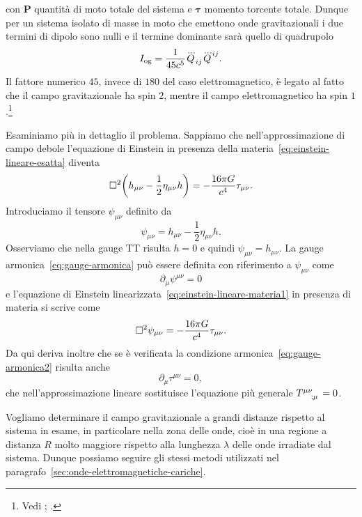 con $\bm{P}$ quantità di moto totale del sistema e $\bm{\tau}$ momento torcente
totale.  Dunque per un sistema isolato di masse in moto che emettono onde
gravitazionali i due termini di dipolo sono nulli e il termine dominante sarà
quello di quadrupolo
\begin{equation}
  I_{\textup{og}} = \frac{1}{45c^{5}}\dddot{Q}_{ij}\dddot{Q}^{ij}.
\end{equation}
Il fattore numerico $45$, invece di $180$ del caso elettromagnetico, è legato al
fatto che il campo gravitazionale ha spin $2$, mentre il campo elettromagnetico
ha spin $1$.\footnote{Vedi \textcite[974]{misner:gravitation};
  \textcite[471]{shapiro:black-holes}.}

Esaminiamo più in dettaglio il problema.  Sappiamo che nell'approssimazione di
campo debole l'equazione di Einstein in presenza della
materia~\eqref{eq:einstein-lineare-esatta} diventa
\begin{equation}
  \label{eq:einstein-lineare-materia1}
  \Box^{2} \bigg(h_{\mu\nu} - \frac{1}{2} \eta_{\mu\nu}h \bigg) = -\frac{16\pi
    G}{c^{4}} \tau_{\mu\nu}.
\end{equation}
Introduciamo il tensore $\psi_{\mu\nu}$ definito da
\begin{equation}
  \psi_{\mu\nu} = h_{\mu\nu} - \frac{1}{2} \eta_{\mu\nu} h.
\end{equation}
Osserviamo che nella gauge TT risulta $h = 0$ e quindi
$\psi_{\mu\nu} = h_{\mu\nu}$.  La gauge armonica~\eqref{eq:gauge-armonica} può
essere definita con riferimento a $\psi_{\mu\nu}$ come
\begin{equation}
  \label{eq:gauge-armonica2}
  \partial_{\mu}\psi^{\mu\nu} = 0
\end{equation}
e l'equazione di Einstein linearizzata~\eqref{eq:einstein-lineare-materia1} in
presenza di materia si scrive come
\begin{equation}
  \label{eq:einstein-lineare-materia2}
  \Box^{2} \psi_{\mu\nu} = -\frac{16\pi G}{c^{4}} \tau_{\mu\nu}.
\end{equation}
Da qui deriva inoltre che se è verificata la condizione
armonica~\eqref{eq:gauge-armonica2} risulta anche
\begin{equation}
  \label{eq:gauge-armonica-tau}
  \partial_{\mu}\tau^{\mu\nu} = 0,
\end{equation}
che nell'approssimazione lineare sostituisce l'equazione più generale
$\tensor{T}{^{\mu\nu}_{;\mu}} = 0$.

Vogliamo determinare il campo gravitazionale a grandi distanze rispetto al
sistema in esame, in particolare nella zona delle onde,
cioè in una regione a distanza $R$ molto maggiore rispetto alla lunghezza
$\lambda$ delle onde irradiate dal sistema.  Dunque possiamo seguire gli stessi
metodi utilizzati nel paragrafo~\ref{sec:onde-elettromagnetiche-cariche}.

